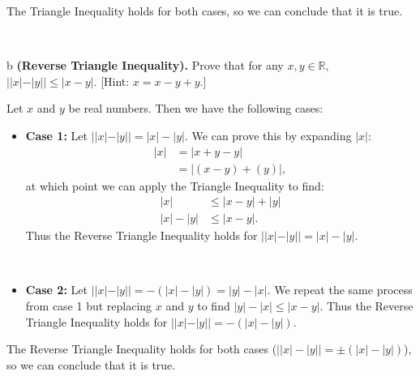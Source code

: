 \documentclass{article}
\begin{document}
\begin{itemize}
    
    
\end{itemize}

The Triangle Inequality holds for both cases, so we can conclude that it is true.

\

\begin{problem} b
\textbf{(Reverse Triangle Inequality).} Prove that for any $x,y\in\mathbb{R},$ $||x|-|y||\le |x-y|.$ [Hint: $x=x-y+y$.]
\end{problem}

Let $x$ and $y$ be real numbers. Then we have the following cases:
\begin{itemize}
    \item \textbf{Case 1:} Let $||x|-|y||=|x|-|y|$. We can prove this by expanding $|x|$:
    \begin{align*}
        |x| &= |x+y-y| \\
        &= |(x-y) + (y) |,
    \end{align*}
    at which point we can apply the Triangle Inequality to find:
    \begin{align*}
        |x| &\leq |x-y| + |y| \\
        |x| - |y| &\leq |x-y|.
    \end{align*}
    Thus the Reverse Triangle Inequality holds for $||x|-|y||=|x|-|y|$.
    
    \
    
    \item \textbf{Case 2:} Let $||x|-|y||=-(|x|-|y|)=|y|-|x|$. We repeat the same process from case 1 but replacing $x$ and $y$ to find $|y| - |x| \leq |x-y|$. Thus the Reverse Triangle Inequality holds for $||x|-|y||=-(|x|-|y|)$.
    
\end{itemize} 

The Reverse Triangle Inequality holds for both cases ($\big| |x|-|y| \big|=\pm (|x|-|y|)$), so we can conclude that it is true.



\end{document}
